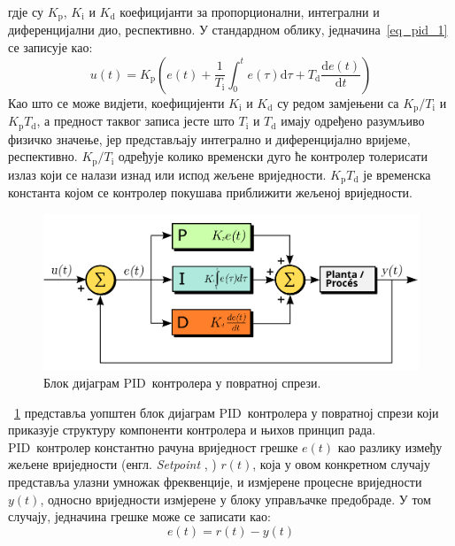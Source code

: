 \documentclass[master]{finthesis}
\makeatletter
\newcommand*{\engl}[2][\@empty]{%
    \edef\theacronym{#1}%
    (енгл. \foreignlanguage{english}{\emph{#2}%
    \ifx\theacronym\@empty \else , #1\fi})%
}
\def \PID  {PID} %
\makeatother
\begin{document}
гдје су $K_\text{p}$, $K_\text{i}$ и $K_\text{d}$ коефицијанти за пропорционални, интегрални и диференцијални дио, респективно. У стандардном облику, једначина~\ref{eq_pid_1} се записује као:
\begin{equation} 
	\label{eq_pid_2}
	u(t)= K_\text{p}\left(e(t) + \frac{1}{T_\text{i}}\int_{0}^{t}e(\tau)\text{d}\tau + T_\text{d}\frac{\text{d}e(t)}{\text{d}t}\right)
\end{equation}
Као што се може видјети, коефицијенти $K_\text{i}$ и $K_\text{d}$ су редом замјењени са $K_\text{p}/T_\text{i}$ и $K_\text{p}T_\text{d}$, а предност таквог записа јесте што $T_\text{i}$ и $T_\text{d}$ имају одређено разумљиво физичко значење, јер представљају интегрално и диференцијално вријеме, респективно. $K_\text{p}/T_\text{i}$ одређује колико временски дуго ће контролер толерисати излаз који се налази изнад или испод жељене вриједности. $K_\text{p}T_\text{d}$ је временска константа којом се контролер покушава приближити жељеној вриједности.
\begin{figure}[!h]
	 \centering
	 \includegraphics[scale=0.3]{slike/pid.png}
	 \caption{Блок дијаграм \PID\ контролера у повратној спрези.}
	 \label{pid_img}
\end{figure}
\figurename~\ref{pid_img} представља уопштен блок дијаграм \PID\ контролера у повратној спрези који приказује структуру компоненти контролера и њихов принцип рада. \PID\ контролер константно рачуна вриједност грешке $e(t)$ као разлику између жељене вриједности \engl{Setpoint} $r(t)$, која у овом конкретном случају представља улазни умножак фреквенције, и измјерене процесне вриједности $y(t)$, односно вриједности измјерене у блоку управљачке предобраде. У том случају, једначина грешке може се записати као:
\begin{equation} 
	\label{eq_pid_err)}
	e(t) = r(t) - y(t)
\end{equation}
\end{document}
